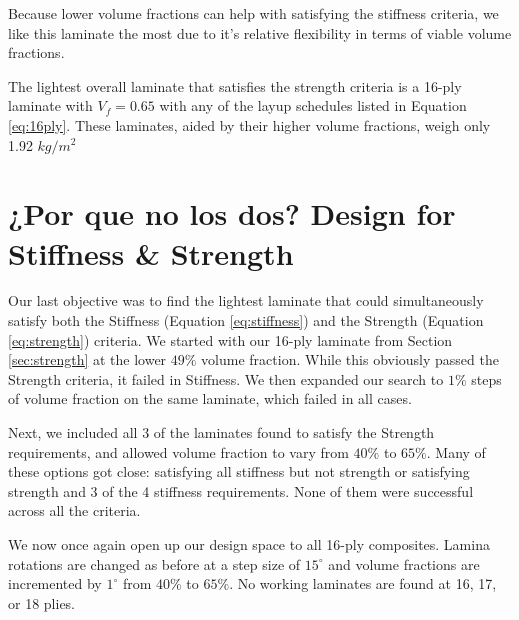\documentclass[12pt]{article}
\begin{document}
Because lower volume fractions can help with satisfying the stiffness criteria, we like this laminate the most due to it's relative flexibility in terms of viable volume fractions. 



\begin{framed}
The lightest overall laminate that satisfies the strength criteria is a 16-ply laminate with $V_f = 0.65$ with any of the layup schedules listed in Equation \ref{eq:16ply}. These laminates, aided by their higher volume fractions, weigh only 1.92 $kg/m^2$
\end{framed}

    

\section{¿Por que no los dos? Design for Stiffness \& Strength}

Our last objective was to find the lightest laminate that could simultaneously satisfy both the Stiffness (Equation \ref{eq:stiffness}) and the Strength (Equation \ref{eq:strength}) criteria. We started with our 16-ply laminate from Section \ref{sec:strength} at the lower $49 \%$ volume fraction. While this obviously passed the Strength criteria, it failed in Stiffness. We then expanded our search to $1\%$ steps of volume fraction on the same laminate, which failed in all cases.

Next, we included all 3 of the laminates found to satisfy the Strength requirements, and allowed volume fraction to vary from $40\%$ to $65\%$. Many of these options got close: satisfying all stiffness but not strength or satisfying strength and 3 of the 4 stiffness requirements. None of them were successful across all the criteria.

We now once again open up our design space to all 16-ply composites. Lamina rotations are changed as before at a step size of $15 ^\circ$ and volume fractions are incremented by $1 ^\circ$ from $40\%$ to $65\%$. No working laminates are found at 16, 17, or 18 plies.
\end{document}
